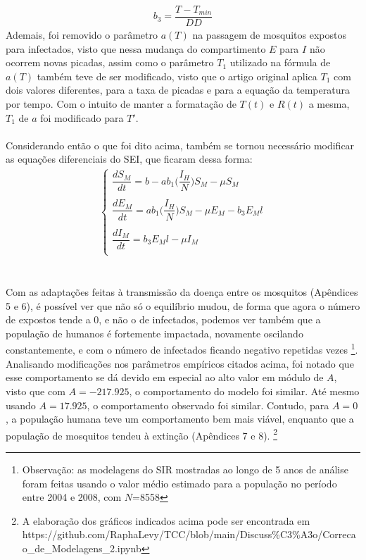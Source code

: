 \documentclass[12pt]{article}
\begin{document}
\begin{gather*}
    b_3 = \dfrac{T-T_{min}}{DD}
\end{gather*}
Ademais, foi removido o parâmetro $a(T)$ na passagem de mosquitos expostos para infectados, visto que nessa mudança do compartimento $E$ para $I$ não ocorrem novas picadas, assim como o parâmetro $T_1$ utilizado na fórmula de $a(T)$ também teve de ser modificado, visto que o artigo original aplica $T_1$ com dois valores diferentes, para a taxa de picadas e para a equação da temperatura por tempo. Com o intuito de manter a formatação de $T(t)$ e $R(t)$ a mesma, $T_1$ de $a$ foi modificado para $T'$.
\\\\
Considerando então o que foi dito acima, também se tornou necessário modificar as equações diferenciais do SEI, que ficaram dessa forma:
\begin{gather*}
\begin{cases}
\dfrac{dS_M}{dt} = b - ab_1\bigg(\dfrac{I_H}{N}\bigg)S_M - \mu S_M\\
\\
\dfrac{dE_M}{dt} = ab_1\bigg(\dfrac{I_H}{N}\bigg)S_M - \mu E_M - b_3E_Ml\\
\\
\dfrac{dI_M}{dt} = b_3E_Ml -\mu I_M\\
\end{cases}
\end{gather*}
\\\\
Com as adaptações feitas à transmissão da doença entre os mosquitos 
(Apêndices 5 e 6), é possível ver que não só o 
equilíbrio mudou, de forma que agora o número de 
expostos tende a 0, e não o de infectados, podemos ver também que a população 
de humanos é fortemente impactada, novamente oscilando constantemente, e com 
o número de infectados ficando negativo repetidas vezes \footnote{Observação: 
as modelagens do SIR mostradas ao longo de 5 anos de análise foram feitas 
usando o valor médio estimado para a população no período entre 2004 e 2008, 
com $N$=8558}.
Analisando modificações nos parâmetros empíricos citados acima, foi notado que esse comportamento se dá devido em especial ao alto valor em módulo de $A$, visto que com $A=-217.925$, o comportamento do modelo foi similar. Até mesmo usando $A=17.925$, o comportamento observado foi similar. Contudo, para $A=0$, a população humana teve um comportamento bem mais viável, enquanto que a população de mosquitos tendeu à extinção (Apêndices 7 e 8).
\footnote{A elaboração dos gráficos indicados acima pode ser encontrada em
\\
https://github.com/RaphaLevy/TCC/blob/main/Discuss\%C3\%A3o/Correcao\_de\_Modelagens\_2.ipynb}
\end{document}
